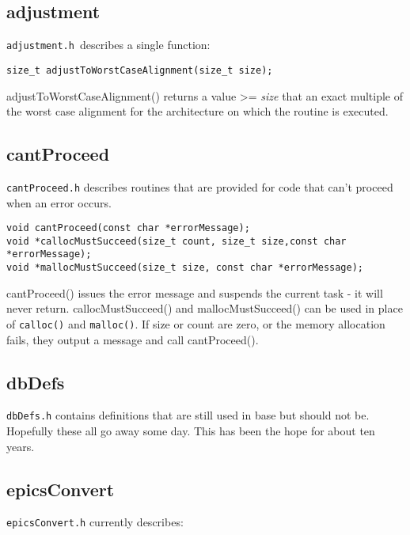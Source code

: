 \subsection{adjustment}

\verb|adjustment.h |describes a single function:

\begin{verbatim}size_t adjustToWorstCaseAlignment(size_t size);
\end{verbatim}adjustToWorstCaseAlignment() returns a value \textgreater{}= \emph{size} that an exact multiple of the worst case alignment for the 
architecture on which the routine is executed.

\subsection{cantProceed}

\verb|cantProceed.h| describes routines that are provided for code that can't proceed when an error occurs.

\begin{verbatim}void cantProceed(const char *errorMessage);
void *callocMustSucceed(size_t count, size_t size,const char *errorMessage);
void *mallocMustSucceed(size_t size, const char *errorMessage);
\end{verbatim}
cantProceed() issues the error message and suspends the current task - it will never return. callocMustSucceed() and 
mallocMustSucceed() can be used in place of \verb|calloc()| and \verb|malloc()|. If size or count are zero, or the memory 
allocation fails, they output a message and call cantProceed().

\subsection{dbDefs}

\verb|dbDefs.h| contains definitions that are still used in base but should not be. Hopefully these all go away some day. This 
has been the hope for about ten years.

\subsection{epicsConvert}

\verb|epicsConvert.h| currently describes:

